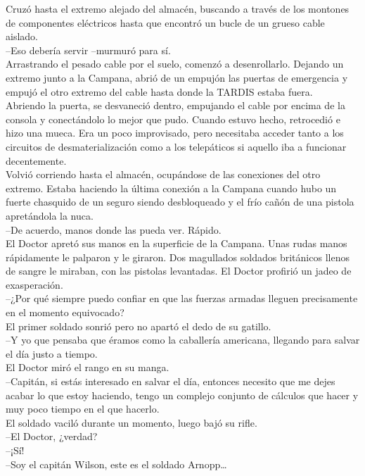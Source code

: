 Cruzó hasta el extremo alejado del almacén, buscando a través de los
montones de componentes eléctricos hasta que encontró un bucle de un
grueso cable aislado.\\
--Eso debería servir --murmuró para sí.\\
Arrastrando el pesado cable por el suelo, comenzó a desenrollarlo.
Dejando un extremo junto a la Campana, abrió de un empujón las puertas
de emergencia y empujó el otro extremo del cable hasta donde la TARDIS
estaba fuera.\\
Abriendo la puerta, se desvaneció dentro, empujando el cable por encima
de la consola y conectándolo lo mejor que pudo. Cuando estuvo hecho,
retrocedió e hizo una mueca. Era un poco improvisado, pero necesitaba
acceder tanto a los circuitos de desmaterialización como a los
telepáticos si aquello iba a funcionar decentemente.\\
Volvió corriendo hasta el almacén, ocupándose de las conexiones del otro
extremo. Estaba haciendo la última conexión a la Campana cuando hubo un
fuerte chasquido de un seguro siendo desbloqueado y el frío cañón de una
pistola apretándola la nuca.\\
--De acuerdo, manos donde las pueda ver. Rápido.\\
El Doctor apretó sus manos en la superficie de la Campana. Unas rudas
manos rápidamente le palparon y le giraron. Dos magullados soldados
británicos llenos de sangre le miraban, con las pistolas levantadas. El
Doctor profirió un jadeo de exasperación.\\
--¿Por qué siempre puedo confiar en que las fuerzas armadas lleguen
precisamente en el momento equivocado?\\
El primer soldado sonrió pero no apartó el dedo de su gatillo.\\
--Y yo que pensaba que éramos como la caballería americana, llegando
para salvar el día justo a tiempo.\\
El Doctor miró el rango en su manga.\\
--Capitán, si estás interesado en salvar el día, entonces necesito que
me dejes acabar lo que estoy haciendo, tengo un complejo conjunto de
cálculos que hacer y muy poco tiempo en el que hacerlo.\\
El soldado vaciló durante un momento, luego bajó su rifle.\\
--El Doctor, ¿verdad?\\
--¡Sí!\\
--Soy el capitán Wilson, este es el soldado Arnopp\ldots{}\\
